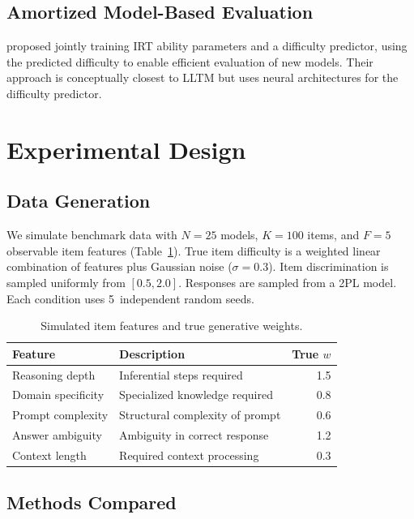 \documentclass[11pt,a4paper]{article}
\begin{document}
\subsection{Amortized Model-Based Evaluation}

\citet{truong2025reliable} proposed jointly training IRT ability
parameters and a difficulty predictor, using the predicted difficulty to
enable efficient evaluation of new models. Their approach is conceptually
closest to LLTM but uses neural architectures for the difficulty
predictor.


\section{Experimental Design}
\label{sec:method}

\subsection{Data Generation}

We simulate benchmark data with $N = 25$ models, $K = 100$ items, and
$F = 5$ observable item features (Table~\ref{tab:features}). True item
difficulty is a weighted linear combination of features plus Gaussian
noise ($\sigma = 0.3$). Item discrimination is sampled uniformly from
$[0.5, 2.0]$. Responses are sampled from a 2PL model. Each condition
uses 5~independent random seeds.

\begin{table}[h]
\centering
\small
\caption{Simulated item features and true generative weights.}
\label{tab:features}
\begin{tabular}{llr}
\toprule
Feature & Description & True $w$ \\
\midrule
Reasoning depth & Inferential steps required & 1.5 \\
Domain specificity & Specialized knowledge required & 0.8 \\
Prompt complexity & Structural complexity of prompt & 0.6 \\
Answer ambiguity & Ambiguity in correct response & 1.2 \\
Context length & Required context processing & 0.3 \\
\bottomrule
\end{tabular}
\end{table}

\subsection{Methods Compared}
\end{document}
